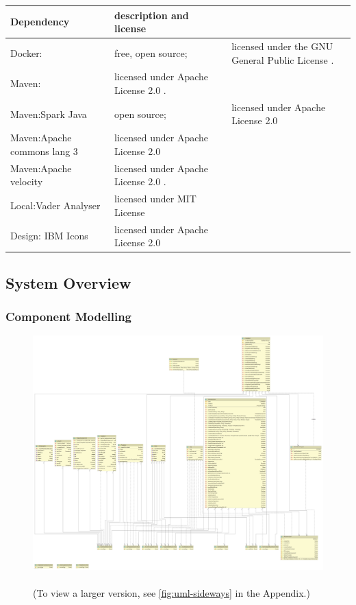 \documentclass[9pt, titlepage]{extarticle}
\begin{document}
\begin{tabularx}{\linewidth}{ l X }
    {Dependency}        & description and license \\
    \hline
    
    {Docker:}           & free, open source;
                        && licensed under the GNU General Public License \cite{docker-license}.\\
    {Maven:}            & licensed under Apache License 2.0 \cite{apache-license-2.0}.\\
    {Maven:Spark Java}  & open source;
                        && licensed under Apache License 2.0 \cite{apache-license-2.0} \\
    {Maven:Apache commons lang 3}  & licensed under Apache License 2.0 \cite{apache-license-2.0}\\
    {Maven:Apache velocity}  & licensed under Apache License 2.0 \cite{apache-license-2.0}.\\

    {Local:Vader Analyser} & licensed under MIT License\\
    {Design: IBM Icons}  & licensed under Apache License 2.0 \cite{apache-license-2.0}\\
\end{tabularx}

\subsection{System Overview}

\subsubsection{Component Modelling}

\begin{figure}[H]
    \centering
    \includegraphics[width=\textwidth]{images/uml.png}
    \caption{\protect \\ (To view a larger version, see \autoref{fig:uml-sideways} in the Appendix.)}
    \label{fig:uml}
\end{figure}
\end{document}
